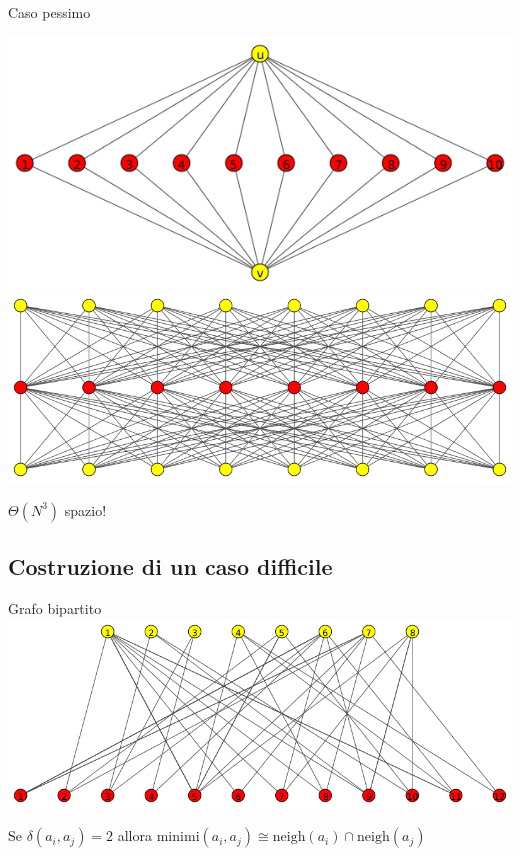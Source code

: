 \documentclass{beamer}
\theoremstyle{plain}
\theoremstyle{definition}
\theoremstyle{remark}
\newcommand{\pa}[1]{\left(#1\right)}
\begin{document}
\begin{frame}{Caso pessimo}
      \begin{overprint}
         \includegraphics[width=\textwidth]{diamante}
         \includegraphics[width=\textwidth]{diamantemultiplo}
        \begin{center}
          $\Theta \pa{N^3}$ spazio!
        \end{center}
      \end{overprint}

\end{frame}

\subsection{Costruzione di un caso difficile}

\begin{frame}{Grafo bipartito}
  \includegraphics[width=\textwidth]{bipartito}
  \pause
  \begin{center}  
  Se $\delta\pa{a_i, a_j}=2$ allora $\mathrm{minimi}(a_i,a_j)
  \cong \mathrm{neigh}(a_i) \cap \mathrm{neigh}(a_j)$
  \end{center}
\end{frame}
\end{document}
